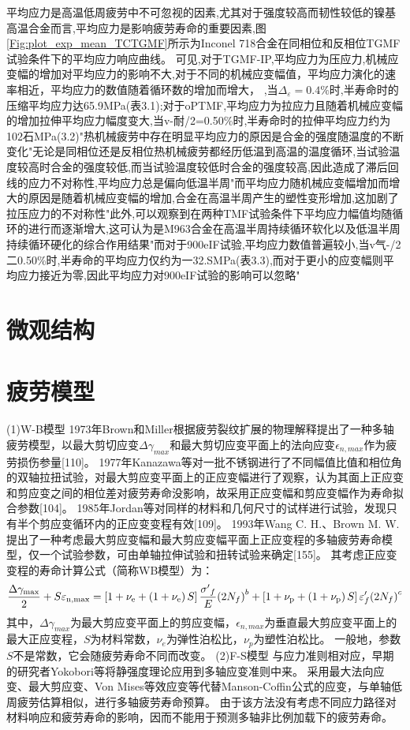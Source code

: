 \documentclass{article}
\begin{document}
平均应力是高温低周疲劳中不可忽视的因素,尤其对于强度较高而韧性较低的镍基高温合金而言,平均应力是影响疲劳寿命的重要因素,图\ref{Fig:plot_exp_mean_TCTGMF}所示为Inconel 718合金在同相位和反相位TGMF试验条件下的平均应力响应曲线。
可见,对于TGMF-IP,平均应力为压应力,机械应变幅的增加对平均应力的影响不大,对于不同的机械应变幅值，平均应力演化的速率相近，平均应力的数值随着循环数的增加而增大，
,当$\Delta_{\varepsilon}=0.4\%$时,半寿命时的压缩平均应力达65.9MPa(表3.1);对于oPTMF,平均应力为拉应力且随着机械应变幅的增加拉伸平均应力幅度变大,当v-耐/2=0.50\%时,半寿命时的拉伸平均应力约为102石MPa(3.2)"热机械疲劳中存在明显平均应力的原因是合金的强度随温度的不断变化"无论是同相位还是反相位热机械疲劳都经历低温到高温的温度循环,当试验温度较高时合金的强度较低,而当试验温度较低时合金的强度较高,因此造成了滞后回线的应力不对称性,平均应力总是偏向低温半周"而平均应力随机械应变幅增加而增大的原因是随着机械应变幅的增加,合金在高温半周产生的塑性变形增加,这加剧了拉压应力的不对称性"此外,可以观察到在两种TMF试验条件下平均应力幅值均随循环的进行而逐渐增大,这可认为是M963合金在高温半周持续循环软化以及低温半周持续循环硬化的综合作用结果"而对于900eIF试验,平均应力数值普遍较小,当v气-/2二0.50\%时,半寿命的平均应力仅约为一32.SMPa(表3.3),而对于更小的应变幅则平均应力接近为零,因此平均应力对900eIF试验的影响可以忽略"

\section{微观结构}

\section{疲劳模型}
(1)W-B模型
1973年Brown和Miller根据疲劳裂纹扩展的物理解释提出了一种多轴疲劳模型，以最大剪切应变$\Delta\gamma_{max}$和最大剪切应变平面上的法向应变$\epsilon_{n,max}$作为疲劳损伤参量[110]。
1977年Kanazawa等对一批不锈钢进行了不同幅值比值和相位角的双轴拉扭试验，对最大剪应变平面上的正应变幅进行了观察，认为其面上正应变和剪应变之间的相位差对疲劳寿命没影响，故采用正应变幅和剪应变幅作为寿命拟合参数[104]。
1985年Jordan等对同样的材料和几何尺寸的试样进行试验，发现只有半个剪应变循环内的正应变变程有效[109]。
1993年Wang C. H.、Brown M. W.提出了一种考虑最大剪应变幅和最大剪应变幅平面上正应变程的多轴疲劳寿命模型，仅一个试验参数，可由单轴拉伸试验和扭转试验来确定[155]。
其考虑正应变变程的寿命计算公式（简称WB模型）为：
\[\frac{{\Delta {\gamma _{{\rm{max}}}}}}{2} + S{\varepsilon _{{\rm{n,max}}}} = \left[ {1 + {\nu _{\rm{e}}} + \left( {1 + {\nu _{\rm{e}}}} \right)S} \right]\frac{{{{\sigma '}_f}}}{E}{\left( {2{N_f}} \right)^b} + \left[ {1 + {\nu _{\rm{p}}} + \left( {1 + {\nu _{\rm{p}}}} \right)S} \right]{\varepsilon '_f}{\left( {2{N_f}} \right)^c}\]
其中，$\Delta\gamma_{max}$为最大剪应变平面上的剪应变幅，$\epsilon_{n,max}$为垂直最大剪应变平面上的最大正应变程，$S$为材料常数，$\nu_e$为弹性泊松比，$\nu_p$为塑性泊松比。
一般地，参数$S$不是常数，它会随疲劳寿命不同而改变。
(2)F-S模型
与应力准则相对应，早期的研究者Yokobori等将静强度理论应用到多轴应变准则中来。
采用最大法向应变、最大剪应变、Von Mises等效应变等代替Manson-Coffin公式的应变，与单轴低周疲劳估算相似，进行多轴疲劳寿命预算。
由于该方法没有考虑不同应力路径对材料响应和疲劳寿命的影响，因而不能用于预测多轴非比例加载下的疲劳寿命。
\end{document}
